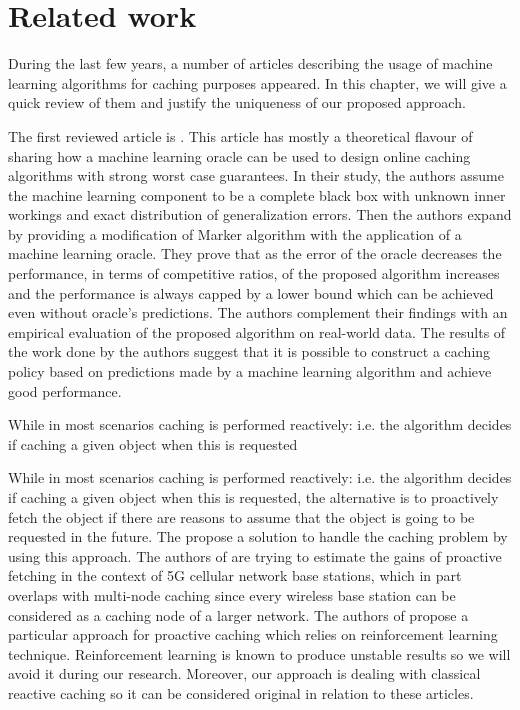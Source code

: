 \section{Related work} \label{related_work}

During the last few years, a number of articles describing the usage of machine learning algorithms for caching purposes appeared. In this chapter, we will give a quick review of them and justify the uniqueness of our proposed approach.

The first reviewed article is \cite{18}. This article has mostly a theoretical flavour of sharing how a machine learning oracle can be used to design online caching algorithms with strong worst case guarantees. In their study, the authors assume the machine learning component to be a complete black box with unknown inner workings and exact distribution of generalization errors. Then the authors expand by providing a modification of Marker algorithm with the application of a machine learning oracle. They prove that as the error of the oracle decreases the performance, in terms of competitive ratios, of the proposed algorithm increases and the performance is always capped by a lower bound which can be achieved even without oracle's predictions. The authors complement their findings with an empirical evaluation of the proposed algorithm on real-world data. The results of the work done by the authors suggest that it is possible to construct a caching policy based on predictions made by a machine learning algorithm and achieve good performance.

While in most scenarios caching is performed reactively: i.e. the algorithm decides if caching a given object when this is requested

While in most scenarios caching is performed reactively: i.e. the algorithm decides if caching a given object when this is requested, the alternative is to proactively fetch the object if there are reasons to assume that the object is going to be requested in the future. The \cite{20, 21} propose a solution to handle the caching problem by using this approach. The authors of \cite{20} are trying to estimate the gains of proactive fetching in the context of 5G cellular network base stations, which in part overlaps with multi-node caching since every wireless base station can be considered as a caching node of a larger network. The authors of \cite{21} propose a particular approach for proactive caching which relies on reinforcement learning technique. Reinforcement learning is known to produce unstable results so we will avoid it during our research. Moreover, our approach is dealing with classical reactive caching so it can be considered original in relation to these articles.

